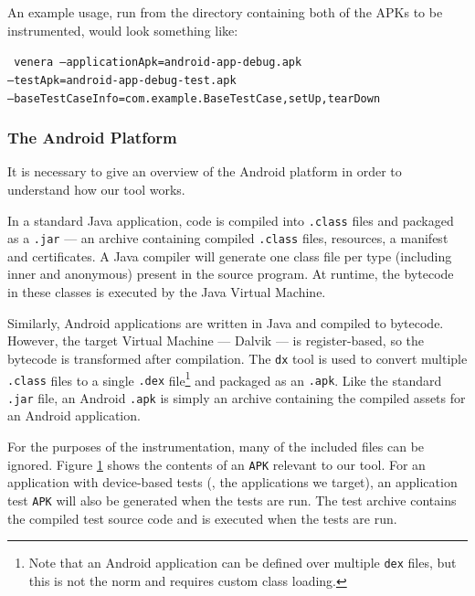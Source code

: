 An example usage, run from the directory containing both of the APKs to be
instrumented, would look something like:

\texttt{
  venera --applicationApk=android-app-debug.apk\\
  --testApk=android-app-debug-test.apk\\
  --baseTestCaseInfo=com.example.BaseTestCase,setUp,tearDown
}

\subsubsection{The Android Platform}

It is necessary to give an overview of the Android platform in order to
understand how our \venerainst{} tool works.

In a standard Java application, code is compiled into {\tt .class} files and
packaged as a {\tt .jar} --- an archive containing compiled {\tt .class} files,
resources, a manifest and certificates. A Java compiler will generate one class
file per type (including inner and anonymous) present in the source program. At
runtime, the bytecode in these classes is executed by the Java Virtual Machine.

Similarly, Android applications are written in Java and compiled to bytecode.
However, the target Virtual Machine --- Dalvik --- is register-based, so the
bytecode is transformed after compilation. The {\tt dx} tool is used to convert
multiple {\tt .class} files to a single {\tt .dex} file\footnote{Note that an
Android application can be defined over multiple {\tt dex} files, but this is
not the norm and requires custom class loading.} and packaged as an {\tt .apk}.
Like the standard {\tt .jar} file, an Android {\tt .apk} is simply an archive
containing the compiled assets for an Android application.

For the purposes of the instrumentation, many of the included files can be
ignored. Figure \ref{fig:android_apk} shows the contents of an {\tt APK}
relevant to our tool. For an application with device-based tests (\ie, the
applications we target), an application test {\tt APK} will also be generated
when the tests are run. The test archive contains the compiled test source code
and is executed when the tests are run.

\begin{figure}[h]
\caption{}
\label{fig:android_apk}
\end{figure}

